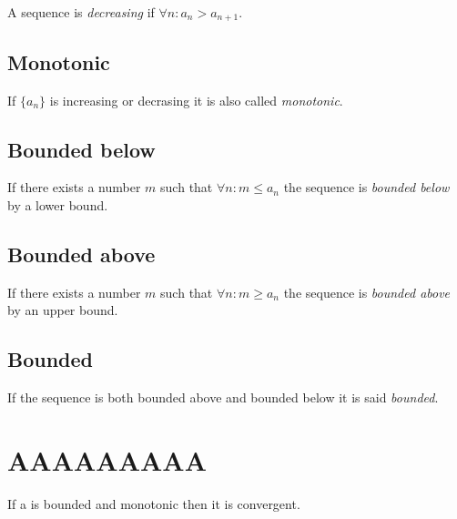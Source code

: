\documentclass{article}
\begin{document}
A sequence is \textit{decreasing} if \(\forall n:  a_n>a_{n+1}\).

\subsection{Monotonic}

If \(\{a_n\}\) is increasing or decrasing it is also called \textit{monotonic}.

\subsection{Bounded below}

If there exists a number \(m\) such that \(\forall n : m \leq a_n\)
the sequence is \textit{bounded below} by a lower bound.

\subsection{Bounded above}

If there exists a number \(m\) such that \(\forall n : m \geq a_n\)
the sequence is \textit{bounded above} by an upper bound.

\subsection{Bounded}

If the sequence is both bounded above and bounded below it is
said \textit{bounded}.

\section{AAAAAAAAA}

If a is bounded and monotonic then it is convergent.

\pagebreak
\end{document}
